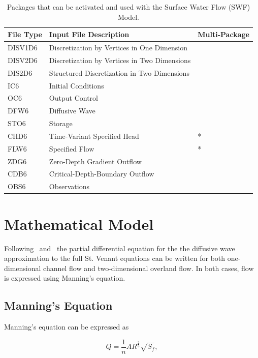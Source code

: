 \documentclass[fleqn]{article}
\begin{document}
\begin{table}[ht]
   \caption{Packages that can be activated and used with the Surface Water Flow (SWF) Model.}
   \begin{tabular*}{\columnwidth}{l l l}
   \hline
   \hline
   File Type & Input File Description & Multi-Package \\
   \hline
   DISV1D6 & Discretization by Vertices in One Dimension \\
   DISV2D6 & Discretization by Vertices in Two Dimensions \\
   DIS2D6 & Structured Discretization in Two Dimensions \\
   IC6 & Initial Conditions \\
   OC6 & Output Control \\
   DFW6 & Diffusive Wave \\ 
   STO6 & Storage \\
   CHD6 & Time-Variant Specified Head & * \\
   FLW6 & Specified Flow & * \\
   ZDG6 & Zero-Depth Gradient Outflow &   \\
   CDB6 & Critical-Depth-Boundary Outflow &   \\
   OBS6 & Observations \\
   \hline 
   \end{tabular*}
   \label{table:ftype-swf}
  \end{table}


\section{Mathematical Model}
Following~\cite{panday2004} and~\cite{hughes2012documentation} the partial differential equation for the the diffusive wave approximation to the full St. Venant equations can be written for both one-dimensional channel flow and two-dimensional overland flow.  In both cases, flow is expressed using Manning's equation.

\subsection{Manning's Equation}

Manning's equation can be expressed as

\begin{equation}
  Q = \frac{1}{n} A R^{\frac{2}{3}} \sqrt{S_f},
  \label{eqn:manning}
\end{equation}
\end{document}

